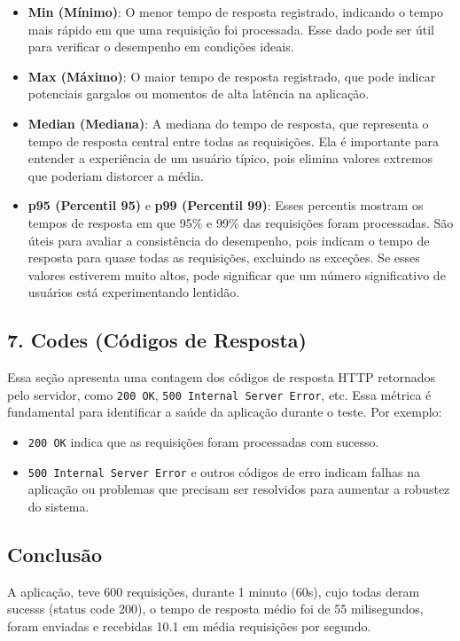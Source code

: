 \begin{itemize}
    \item \textbf{Min (Mínimo)}: O menor tempo de resposta registrado, indicando o tempo mais rápido em que uma requisição foi processada. Esse dado pode ser útil para verificar o desempenho em condições ideais.
    \item \textbf{Max (Máximo)}: O maior tempo de resposta registrado, que pode indicar potenciais gargalos ou momentos de alta latência na aplicação.
    \item \textbf{Median (Mediana)}: A mediana do tempo de resposta, que representa o tempo de resposta central entre todas as requisições. Ela é importante para entender a experiência de um usuário típico, pois elimina valores extremos que poderiam distorcer a média.
    \item \textbf{p95 (Percentil 95)} e \textbf{p99 (Percentil 99)}: Esses percentis mostram os tempos de resposta em que 95\% e 99\% das requisições foram processadas. São úteis para avaliar a consistência do desempenho, pois indicam o tempo de resposta para quase todas as requisições, excluindo as exceções. Se esses valores estiverem muito altos, pode significar que um número significativo de usuários está experimentando lentidão.
\end{itemize}

\subsection{7. Codes (Códigos de Resposta)}

Essa seção apresenta uma contagem dos códigos de resposta HTTP retornados pelo servidor, como \texttt{200 OK}, \texttt{500 Internal Server Error}, etc. Essa métrica é fundamental para identificar a saúde da aplicação durante o teste. Por exemplo:

\begin{itemize}
    \item \texttt{200 OK} indica que as requisições foram processadas com sucesso.
    \item \texttt{500 Internal Server Error} e outros códigos de erro indicam falhas na aplicação ou problemas que precisam ser resolvidos para aumentar a robustez do sistema.
\end{itemize}

\subsection{Conclusão}

A aplicação, teve 600 requisições, durante 1 minuto (60s), cujo todas deram sucesss (status code 200), o tempo de resposta médio foi de 55 milisegundos, foram enviadas e recebidas 10.1 em média requisições por segundo.


